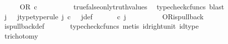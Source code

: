 \begin{isabellebody}
\ \ \isamarkupfalse%
\ \isamarkupfalse%
\ {\isachardoublequoteopen}OR\ {\isasymcirc}\isactrlsub c\ {\isasymlangle}{\isasymf}{\isacharcomma}{\kern0pt}{\isasymf}{\isasymrangle}\ {\isacharequal}{\kern0pt}\ {\isasymt}{\isachardoublequoteclose}\isanewline
\ \ \ \ \isamarkupfalse%
\ \ true{\isacharunderscore}{\kern0pt}false{\isacharunderscore}{\kern0pt}only{\isacharunderscore}{\kern0pt}truth{\isacharunderscore}{\kern0pt}values\ \isamarkupfalse%
\ {\isacharparenleft}{\kern0pt}typecheck{\isacharunderscore}{\kern0pt}cfuncs{\isacharcomma}{\kern0pt}\ blast{\isacharparenright}{\kern0pt}\isanewline
\ \ \isamarkupfalse%
\ \isamarkupfalse%
\ j\ \ \ j{\isacharunderscore}{\kern0pt}type{\isacharbrackleft}{\kern0pt}type{\isacharunderscore}{\kern0pt}rule{\isacharbrackright}{\kern0pt}{\isacharcolon}{\kern0pt}\ {\isachardoublequoteopen}j\ {\isasymin}\isactrlsub c\ {\isasymone}{\isasymCoprod}{\isacharparenleft}{\kern0pt}{\isasymone}{\isasymCoprod}{\isasymone}{\isacharparenright}{\kern0pt}{\isachardoublequoteclose}\ \ j{\isacharunderscore}{\kern0pt}def{\isacharcolon}{\kern0pt}\ {\isachardoublequoteopen}{\isacharparenleft}{\kern0pt}{\isasymlangle}{\isasymt}{\isacharcomma}{\kern0pt}\ {\isasymt}{\isasymrangle}{\isasymamalg}\ {\isacharparenleft}{\kern0pt}{\isasymlangle}{\isasymt}{\isacharcomma}{\kern0pt}\ {\isasymf}{\isasymrangle}\ {\isasymamalg}{\isasymlangle}{\isasymf}{\isacharcomma}{\kern0pt}\ {\isasymt}{\isasymrangle}{\isacharparenright}{\kern0pt}{\isacharparenright}{\kern0pt}\ {\isasymcirc}\isactrlsub c\ j\ \ {\isacharequal}{\kern0pt}\ {\isasymlangle}{\isasymf}{\isacharcomma}{\kern0pt}{\isasymf}{\isasymrangle}{\isachardoublequoteclose}\isanewline
\ \ \ \ \isamarkupfalse%
\ \ OR{\isacharunderscore}{\kern0pt}is{\isacharunderscore}{\kern0pt}pullback\ \isamarkupfalse%
\ is{\isacharunderscore}{\kern0pt}pullback{\isacharunderscore}{\kern0pt}def\ \isanewline
\ \ \ \ \isamarkupfalse%
\ {\isacharparenleft}{\kern0pt}typecheck{\isacharunderscore}{\kern0pt}cfuncs{\isacharcomma}{\kern0pt}\ metis\ id{\isacharunderscore}{\kern0pt}right{\isacharunderscore}{\kern0pt}unit{}\ id{\isacharunderscore}{\kern0pt}type{\isacharparenright}{\kern0pt}\isanewline
\ \ \isamarkupfalse%
\ trichotomy{\isacharcolon}{\kern0pt}\ {\isachardoublequoteopen}{\isacharparenleft}{\kern0pt}{\isasymlangle}{\isasymt}{\isacharcomma}{\kern0pt}\ {\isasymt}{\isasymrangle}\ {\isacharequal}{\kern0pt}\ {\isasymlangle}{\isasymf}{\isacharcomma}{\kern0pt}{\isasymf}{\isasymrangle}{\isacharparenright}{\kern0pt}\ {\isasymor}\ {\isacharparenleft}{\kern0pt}{\isacharparenleft}{\kern0pt}{\isasymlangle}{\isasymt}{\isacharcomma}{\kern0pt}\ {\isasymf}{\isasymrangle}\ {\isacharequal}{\kern0pt}\ {\isasymlangle}{\isasymf}{\isacharcomma}{\kern0pt}{\isasymf}{\isasymrangle}{\isacharparenright}{\kern0pt}\ {\isasymor}\ {\isacharparenleft}{\kern0pt}{\isasymlangle}{\isasymf}{\isacharcomma}{\kern0pt}\ {\isasymt}{\isasymrangle}\ {\isacharequal}{\kern0pt}\ {\isasymlangle}{\isasymf}{\isacharcomma}{\kern0pt}{\isasymf}{\isasymrangle}{\isacharparenright}{\kern0pt}{\isacharparenright}{\kern0pt}{\isachardoublequoteclose}\isanewline

\end{isabellebody}
